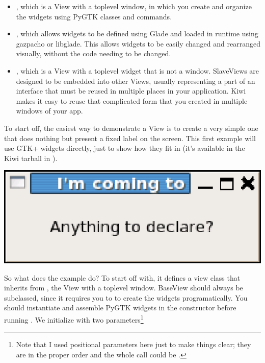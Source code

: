 \documentclass[a4paper]{howto}
\begin{document}
\begin{itemize}
\item {}, which is a View with a toplevel window, in which
you create and organize the widgets using PyGTK classes and commands.
\item {}, which allows widgets to be defined using Glade
and loaded in runtime using gazpacho or libglade. This allows widgets to
be easily changed and rearranged visually, without the code needing
to be changed.
\item {}, which is a View with a toplevel widget that is
not a window. SlaveViews are designed to be embedded into other Views,
usually representing a part of an interface that must be reused in
multiple places in your application. Kiwi makes it easy to reuse that
complicated form that you created in multiple windows of your app.
\end{itemize}

To start off, the easiest way to demonstrate a View is to create a very
simple one that does nothing but present a fixed label on the screen.
This first example will use GTK+ widgets directly, just to show how they
fit in (it's available in the Kiwi tarball in
).

\begin{center}
\includegraphics[scale=0.905]{images/london.eps}
\end{center}



So what does the example do? To start off with, it defines a view class
that inherits from , the View with a toplevel window.
BaseView should always be subclassed, since it requires you to to create
the widgets programatically.  You should instantiate and assemble PyGTK
widgets in the constructor before running
. We initialize  with
two parameters\footnote{Note that I used positional parameters here just
to make things clear; they are in the proper order and the whole call
could be .}
\end{document}
